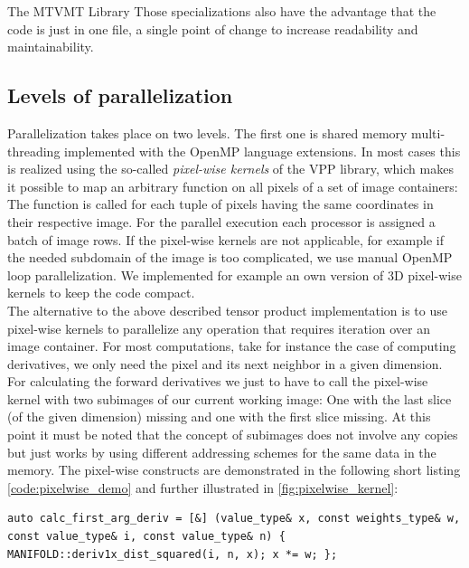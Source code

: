\begin{chapter}{The MTVMT Library}
Those specializations also have the advantage that the code is just in one file, a single point of change to increase readability and maintainability.


\subsection{Levels of parallelization} %
\label{sub:Levels of parallelization}
Parallelization takes place on two levels. The first one is shared memory multi-threading implemented with the OpenMP language extensions. In most cases this is realized 
using the so-called \textit{pixel-wise kernels} of the VPP library, which makes it possible to map an arbitrary function on all pixels of a set of image containers: The function is
called for each tuple of pixels having the same coordinates in their respective image. For the parallel execution each processor is assigned a batch of image rows.
If the pixel-wise kernels are not applicable, for example if the needed subdomain of the image is too complicated, we use manual OpenMP loop parallelization. We implemented for example an own version of 3D pixel-wise kernels to keep the code compact.\\

The alternative to the above described tensor product implementation is to use pixel-wise kernels to parallelize any operation that requires iteration over an image container.
For most computations, take for instance the case of computing derivatives, we only need the pixel and its next neighbor in a given dimension. For calculating the forward derivatives we just 
to have to call the pixel-wise kernel with two subimages of our current working image: One with the last slice (of the given dimension) missing and one with the first slice missing. At this point it must be noted that the concept of subimages does not
involve any copies but just works by using different addressing schemes for the same
data in the memory.
The pixel-wise constructs are demonstrated in the following short listing \ref{code:pixelwise_demo} and further illustrated in \ref{fig:pixelwise_kernel}:\\

\cppinline
\begin{lstlisting}[label=code:pixelwise_demo,caption={Pixel-wise forward derivative computation}]
auto calc_first_arg_deriv = [&] (value_type& x, const weights_type& w, const value_type& i, const value_type& n) { MANIFOLD::deriv1x_dist_squared(i, n, x); x *= w; }; 


\end{lstlisting}
\end{chapter}
